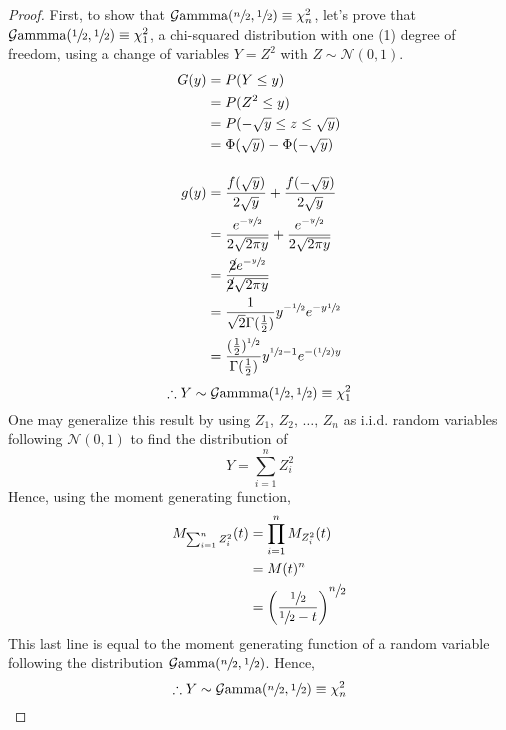 \documentclass[12pt]{article}
\newcommand{\G}{\mathcal{G}}
\newcommand{\N}{\mathcal{N}}
\begin{document}
\begin{proof}
	First, to show that $\G\text{ammma}(\sfrac{n}{2},\sfrac{1}{2})\equiv\chi^2_n$, let's prove that
	$\G\text{ammma}(\sfrac{1}{2},\sfrac{1}{2})\equiv\chi^2_1$, a chi-squared distribution with one (1) degree of
	freedom, using a change of variables $Y=Z^2$ with $Z\sim\N(0, 1)$.
	\begin{equation}\label{eq:relation:chisquared:1}
		\begin{split}
			G(y)	&=	P(Y\leq y)\\
					&=	P(Z^2\leq y)\\
					&=	P(-\sqrt{y}\leq z \leq \sqrt{y})\\
					&=	\Phi(\sqrt{y})-\Phi(-\sqrt{y})\\[12pt]
			g(y)	&=	\frac{f(\sqrt{y})}{2\sqrt{y}}+\frac{f(-\sqrt{y})}{2\sqrt{y}}\\
					&=	\frac{e^{-\sfrac{y}{2}}}{2\sqrt{2\pi y}} + \frac{e^{-\sfrac{y}{2}}}{2\sqrt{2\pi y}}\\
					&=	\frac{\cancel{2}e^{-\sfrac{y}{2}}}{\cancel{2}\sqrt{2\pi y}}\\
					&=	\frac{1}{\sqrt{2}\Gamma(\frac{1}{2})}y^{-\sfrac{1}{2}}e^{-y\sfrac{1}{2}}\\
					&=	\frac{(\frac{1}{2})^{\sfrac{1}{2}}}{\Gamma(\frac{1}{2})}y^{\sfrac{1}{2}-1}e^{-(\sfrac{1}{2})y}
			\end{split}
	\end{equation}
	\begin{equation}
		\therefore Y\sim\G\text{ammma}(\sfrac{1}{2}, \sfrac{1}{2})\equiv\chi^2_1
	\end{equation}
	One may generalize this result by using $Z_1,\,Z_2,\,\ldots,\,Z_n$ as i.i.d. random variables following $\N(0, 1)$
	to find the distribution of
	\begin{equation}
		Y = \sum^n_{i=1}Z^2_i
	\end{equation}
	Hence, using the moment generating function,
	\begin{equation}\label{eq:relation:chisquared:n}
		\begin{split}
			M_{\sum^n_{i=1}Z^2_i}(t)	&=	\prod^n_{i=1}M_{Z^2_i}(t)\\
										&=	M(t)^n\\
										&=	\left(\frac{\sfrac{1}{2}}{\sfrac{1}{2}-t}\right)^{\displaystyle\sfrac{n}{2}}
		\end{split}
	\end{equation}
	This last line is equal to the moment generating function of a random variable following the distribution
	$\G\text{amma}(\sfrac{n}{2}, \sfrac{1}{2})$. Hence,
	\begin{equation}
		\therefore Y\sim\G\text{amma}(\sfrac{n}{2}, \sfrac{1}{2})\equiv \chi^2_n
	\end{equation}
\end{proof}
\end{document}
